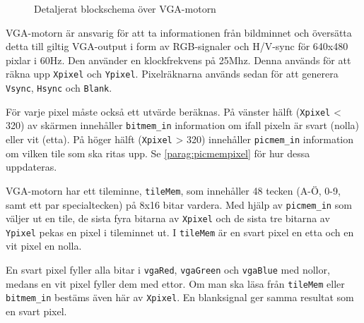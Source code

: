 \documentclass[]{article}
\begin{document}
\begin{figure}[h!]
	\caption{Detaljerat blockschema över VGA-motorn}
\end{figure}

VGA-motorn är ansvarig för att ta informationen från bildminnet och översätta detta till giltig VGA-output i form av RGB-signaler och H/V-sync för 640x480 pixlar i 60Hz. Den använder en klockfrekvens på 25Mhz. Denna används för att räkna upp \texttt{Xpixel} och \texttt{Ypixel}. Pixelräknarna används sedan för att generera \texttt{Vsync}, \texttt{Hsync} och \texttt{Blank}.

För varje pixel måste också ett utvärde beräknas. På vänster hälft (\texttt{Xpixel} < 320) av skärmen innehåller \texttt{bitmem\_in} information om ifall pixeln är svart (nolla) eller vit (etta). På höger hälft (\texttt{Xpixel} > 320) innehåller \texttt{picmem\_in} information om vilken tile som ska ritas upp. Se \ref{parag:picmempixel} för hur dessa uppdateras.

VGA-motorn har ett tileminne, \texttt{tileMem}, som innehåller 48 tecken (A-Ö, 0-9, samt ett par specialtecken) på 8x16 bitar vardera. Med hjälp av \texttt{picmem\_in} som väljer ut en tile, de sista fyra bitarna av \texttt{Xpixel} och de sista tre bitarna av \texttt{Ypixel} pekas en pixel i tileminnet ut. I \texttt{tileMem} är en svart pixel en etta och en vit pixel en nolla. 

En svart pixel fyller alla bitar i \texttt{vgaRed}, \texttt{vgaGreen} och \texttt{vgaBlue} med nollor, medans en vit pixel fyller dem med ettor. Om man ska läsa från \texttt{tileMem} eller \texttt{bitmem\_in} bestäms även här av \texttt{Xpixel}. En blanksignal ger samma resultat som en svart pixel.
\end{document}
